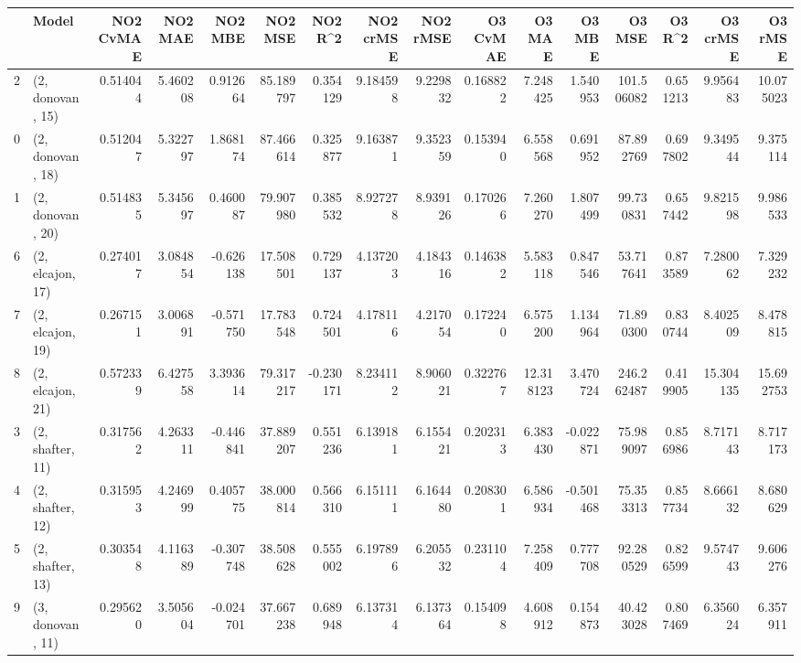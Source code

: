 \begin{tabular}{llrrrrrrrrrrrrrr}
\toprule
{} &             Model &  NO2 CvMAE &   NO2 MAE &   NO2 MBE &    NO2 MSE &   NO2 R\textasciicircum2 &  NO2 crMSE &  NO2 rMSE &  O3 CvMAE &     O3 MAE &    O3 MBE &      O3 MSE &    O3 R\textasciicircum2 &   O3 crMSE &    O3 rMSE \\
\midrule
2  &  (2, donovan, 15) &   0.514044 &  5.460208 &  0.912664 &  85.189797 &  0.354129 &   9.184598 &  9.229832 &  0.168822 &   7.248425 &  1.540953 &  101.506082 &  0.651213 &   9.956483 &  10.075023 \\
0  &  (2, donovan, 18) &   0.512047 &  5.322797 &  1.868174 &  87.466614 &  0.325877 &   9.163871 &  9.352359 &  0.153940 &   6.558568 &  0.691952 &   87.892769 &  0.697802 &   9.349544 &   9.375114 \\
1  &  (2, donovan, 20) &   0.514835 &  5.345697 &  0.460087 &  79.907980 &  0.385532 &   8.927278 &  8.939126 &  0.170266 &   7.260270 &  1.807499 &   99.730831 &  0.657442 &   9.821598 &   9.986533 \\
6  &  (2, elcajon, 17) &   0.274017 &  3.084854 & -0.626138 &  17.508501 &  0.729137 &   4.137203 &  4.184316 &  0.146382 &   5.583118 &  0.847546 &   53.717641 &  0.873589 &   7.280062 &   7.329232 \\
7  &  (2, elcajon, 19) &   0.267151 &  3.006891 & -0.571750 &  17.783548 &  0.724501 &   4.178116 &  4.217054 &  0.172240 &   6.575200 &  1.134964 &   71.890300 &  0.830744 &   8.402509 &   8.478815 \\
8  &  (2, elcajon, 21) &   0.572339 &  6.427558 &  3.393614 &  79.317217 & -0.230171 &   8.234112 &  8.906021 &  0.322767 &  12.318123 &  3.470724 &  246.262487 &  0.419905 &  15.304135 &  15.692753 \\
3  &  (2, shafter, 11) &   0.317562 &  4.263311 & -0.446841 &  37.889207 &  0.551236 &   6.139181 &  6.155421 &  0.202313 &   6.383430 & -0.022871 &   75.989097 &  0.856986 &   8.717143 &   8.717173 \\
4  &  (2, shafter, 12) &   0.315953 &  4.246999 &  0.405775 &  38.000814 &  0.566310 &   6.151111 &  6.164480 &  0.208301 &   6.586934 & -0.501468 &   75.353313 &  0.857734 &   8.666132 &   8.680629 \\
5  &  (2, shafter, 13) &   0.303548 &  4.116389 & -0.307748 &  38.508628 &  0.555002 &   6.197896 &  6.205532 &  0.231104 &   7.258409 &  0.777708 &   92.280529 &  0.826599 &   9.574743 &   9.606276 \\
9  &  (3, donovan, 11) &   0.295620 &  3.505604 & -0.024701 &  37.667238 &  0.689948 &   6.137314 &  6.137364 &  0.154098 &   4.608912 &  0.154873 &   40.423028 &  0.807469 &   6.356024 &   6.357911 \\

\end{tabular}
